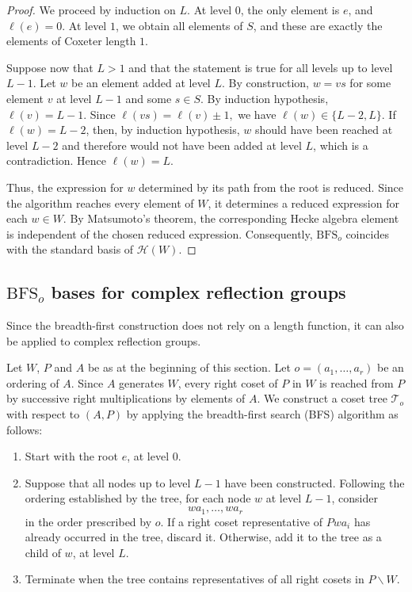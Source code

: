 \documentclass[11pt, reqno]{amsart}
\newcommand{\cH}{\mathcal{H}}
\newcommand{\BFS}{\mathrm{BFS}}
\numberwithin{equation}{section}
\theoremstyle{remark}
\begin{document}
	\begin{proof}
		We proceed by induction on $L$. At level $0$, the only element is $e$, and  $\ell(e)=0$.
		At level $1$, we obtain all elements of $S$, and these are exactly the elements of Coxeter length $1$.
		
		Suppose now that $L>1$ and that the statement is true for all levels up to level $L-1$. Let $w$ be an element added at level $L$. By construction, $w=vs$ for some element $v$ at level $L-1$ and some $s\in S$. By induction hypothesis, $\ell(v)=L-1$. Since
		$
		\ell(vs)=\ell(v)\pm1,
		$
		we have
		$
		\ell(w)\in\{L-2,L\}.
		$	
		If $\ell(w)=L-2$, then, by induction hypothesis, $w$ should have  been reached at  level $L-2$ and therefore would not have been added at level $L$, which is a contradiction. Hence $\ell(w)=L$.
		
		Thus, the expression for $w$ determined by its path from the root is reduced. Since the algorithm reaches every element of $W$, it determines a reduced expression for each $w\in W$. By Matsumoto's theorem, the corresponding Hecke algebra element is independent of the chosen reduced expression. Consequently, $\BFS_o$ coincides with the standard basis of $\cH(W)$.
	\end{proof}
	
	\subsection{$\BFS_o$ bases for complex reflection groups}
	
	Since the breadth-first construction does not rely on a length function, it can also be applied to complex reflection groups.
	
	Let $W$, $P$ and $A$ be as at the beginning of this section. Let
	$
	o=(a_1,\ldots,a_r)
	$
	be an ordering of  $A$. Since $A$ generates $W$, every right coset of $P$ in $W$ is reached from $P$ by successive right multiplications by elements of $A$.
	We construct a coset tree $\mathcal T_o$ with respect to $(A,P)$ by applying the breadth-first search (BFS) algorithm as follows:
	
	\begin{enumerate}	
		\item Start with the root $e$, at level $0$.\smallbreak
		\item Suppose that all nodes up to level $L-1$ have been constructed. 
		Following the ordering established by the tree, for each node $w$ at level $L-1$, consider
		\[
		wa_1,\ldots,wa_r
		\]
		in the order prescribed by $o$. If a right coset representative of $Pwa_i$ has already occurred in the tree, discard it. Otherwise, add it to the tree as a child of $w$, at level $L$. \smallbreak
		
		\item Terminate when the tree contains representatives of all right cosets in $P\backslash W$.
	\end{enumerate}
	
\end{document}
